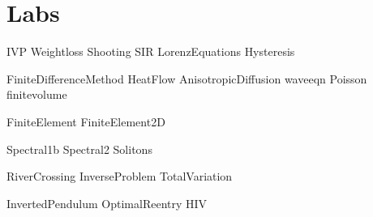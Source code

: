 \documentclass[nociteref]{SIAM-GH-book}
\begin{document}
\setcounter{tocdepth}{1}
\tableofcontents

\mainmatter %

\part{Labs}
{IVP}
{Weightloss}
{Shooting}
{SIR}
{LorenzEquations}
{Hysteresis}

{FiniteDifferenceMethod}
{HeatFlow}
{AnisotropicDiffusion}
{waveeqn}
{Poisson}
{finitevolume}

{FiniteElement}
{FiniteElement2D}

{Spectral1b}
{Spectral2}
{Solitons}

{RiverCrossing}
{InverseProblem}
{TotalVariation}

{InvertedPendulum}
{OptimalReentry}
{HIV}
\end{document}
